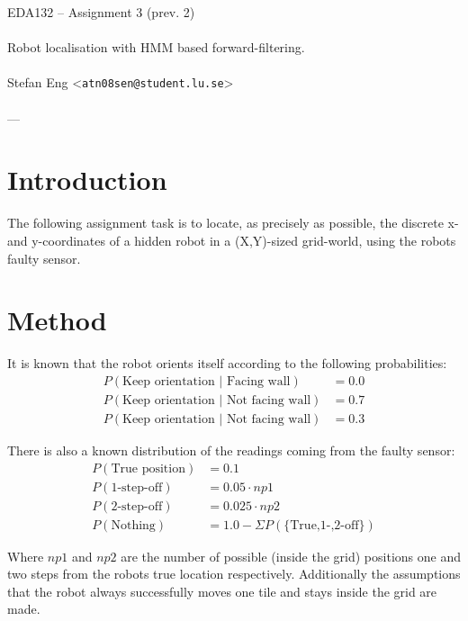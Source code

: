 \documentclass{article}
\begin{document}
  \begin{center}
    EDA132 -- Assignment 3 (prev. 2)\\
    \ \\
    {\Large Robot localisation with HMM based forward-filtering.} \\
    \ \\
    Stefan Eng <\texttt{atn08sen@student.lu.se}> \\
    \ \\
    ---
  \end{center}
  \vspace{-0.8cm}
  \section*{Introduction}

    The following assignment task is to locate, as precisely as possible, the
    discrete x- and y-coordinates of a hidden robot in a (X,Y)-sized
    grid-world, using the robots faulty sensor.

  \section*{Method}

    It is known that the robot orients itself according to the following
    probabilities:
    \begin{align*}
      P(\textrm{Keep orientation | Facing wall}) &= 0.0 \\
      P(\textrm{Keep orientation | Not facing wall}) &= 0.7 \\
      P(\textrm{Keep orientation | Not facing wall}) &= 0.3
    \end{align*}

    There is also a known distribution of the readings coming from the faulty
    sensor:
    \begin{align*}
      P(\textrm{True position}) &= 0.1 \\
      P(\textrm{1-step-off}) &= 0.05 \cdot np1\\
      P(\textrm{2-step-off}) &= 0.025 \cdot np2\\
      P(\textrm{Nothing}) &= 1.0-\Sigma P(\textrm{\{True,1-,2-off\}})
    \end{align*}

    Where $np1$ and $np2$ are the number of possible (inside the grid)
    positions one and two steps from the robots true location respectively.
    Additionally the assumptions that the robot always successfully moves one
    tile and stays inside the grid are made. \\
\end{document}
